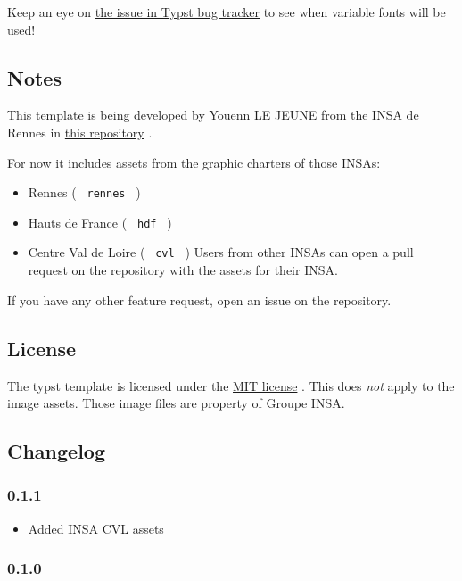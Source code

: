 Keep an eye on \href{https://github.com/typst/typst/issues/185}{the
issue in Typst bug tracker} to see when variable fonts will be used!

\subsection{Notes}\label{notes}

This template is being developed by Youenn LE JEUNE from the INSA de
Rennes in \href{https://github.com/SkytAsul/INSA-Typst-Template}{this
repository} .

For now it includes assets from the graphic charters of those INSAs:

\begin{itemize}
\tightlist
\item
  Rennes ( \texttt{\ rennes\ } )
\item
  Hauts de France ( \texttt{\ hdf\ } )
\item
  Centre Val de Loire ( \texttt{\ cvl\ } ) Users from other INSAs can
  open a pull request on the repository with the assets for their INSA.
\end{itemize}

If you have any other feature request, open an issue on the repository.

\subsection{License}\label{license}

The typst template is licensed under the
\href{https://github.com/SkytAsul/INSA-Typst-Template/blob/main/LICENSE}{MIT
license} . This does \emph{not} apply to the image assets. Those image
files are property of Groupe INSA.

\subsection{Changelog}\label{changelog}

\subsubsection{0.1.1}\label{section}

\begin{itemize}
\tightlist
\item
  Added INSA CVL assets
\end{itemize}

\subsubsection{0.1.0}\label{section-1}

